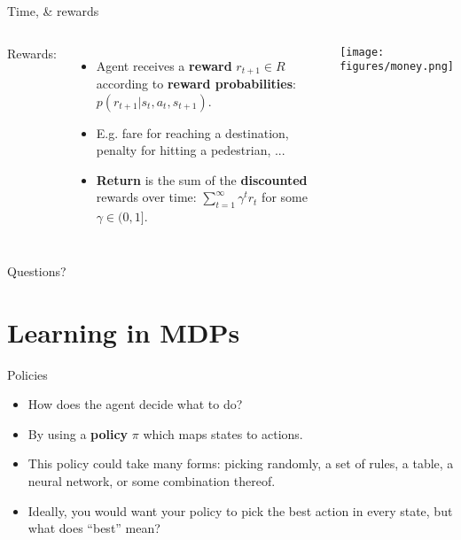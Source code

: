 \documentclass{beamer}
\begin{document}
\begin{frame}{Time, \& rewards}
\begin{columns}
Rewards:
\begin{itemize}
    \item Agent receives a \textbf{reward} \(r_{t+1} \in R\) according to \textbf{reward probabilities}: \(p(r_{t+1} | s_t, a_t, s_{t+1})\). 
    \item<2-> E.g. fare for reaching a destination, penalty for hitting a pedestrian, ...
    \item<3-> \textbf{Return} is the sum of the \textbf{discounted} rewards over time: \(\sum_{t=1}^\infty \gamma^t r_t\) for some \(\gamma \in (0, 1]\).
\end{itemize}
    \begin{center}
    \texttt{[image: figures/money.png]}
    \end{center}
\end{columns}
\end{frame}

\begin{frame}[standout]
Questions?
\end{frame}

\section{Learning in MDPs}
\begin{frame}{Policies}
\begin{itemize}
\item How does the agent decide what to do?
\item<2-> By using a \textbf{policy} \(\pi\) which maps states to actions.
\item<3-> This policy could take many forms: picking randomly, a set of rules, a table, a neural network, or some combination thereof.
\item<4-> Ideally, you would want your policy to pick the best action in every state, but what does ``best'' mean?
\end{itemize}
\end{frame}
\end{document}
